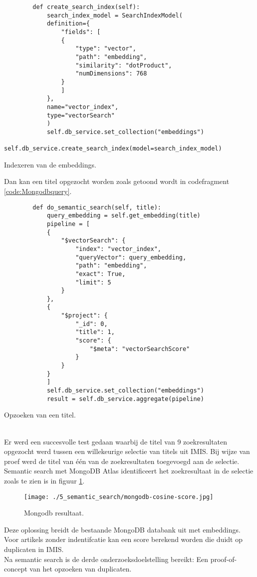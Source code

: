 \begin{listing}
    \begin{verbatim}
        def create_search_index(self):
            search_index_model = SearchIndexModel(
            definition={
                "fields": [
                {
                    "type": "vector",
                    "path": "embedding",
                    "similarity": "dotProduct",
                    "numDimensions": 768
                }
                ]
            },
            name="vector_index",
            type="vectorSearch"
            )
            self.db_service.set_collection("embeddings")
            self.db_service.create_search_index(model=search_index_model)
    \end{verbatim}
    \caption[MongoDB calculate index]{Indexeren van de embeddings.}
    \label{code:Mongodbindex}
\end{listing}
Dan kan een titel opgezocht worden zoals getoond wordt in codefragment \ref{code:Mongodbquery}.
\begin{listing}
    \begin{verbatim}
        def do_semantic_search(self, title):
            query_embedding = self.get_embedding(title)
            pipeline = [
            {
                "$vectorSearch": {
                    "index": "vector_index",
                    "queryVector": query_embedding,
                    "path": "embedding",
                    "exact": True,
                    "limit": 5
                }
            },
            {
                "$project": {
                    "_id": 0,
                    "title": 1,
                    "score": {
                        "$meta": "vectorSearchScore"
                    }
                }
            }
            ]
            self.db_service.set_collection("embeddings")
            result = self.db_service.aggregate(pipeline)
    \end{verbatim}
    \caption[MongoDB query]{Opzoeken van een titel.}
    \label{code:Mongodbquery}
\end{listing}
\\
Er werd een succesvolle test gedaan waarbij de titel van 9 zoekresultaten opgezocht werd tussen een willekeurige selectie van titels uit IMIS. Bij wijze van proef werd de titel van één van de zoekresultaten toegevoegd aan de selectie. Semantic search met MongoDB Atlas identificeert het zoekresultaat in de selectie zoals te zien is in figuur \ref{fig:Mongodb}.
\begin{figure}
    \centering
    \texttt{[image: ./5\_semantic\_search/mongodb-cosine-score.jpg]}
    \caption[Mongodb resultaat.]{\label{fig:Mongodb}Mongodb resultaat.}
\end{figure}
Deze oplossing breidt de bestaande MongoDB databank uit met embeddings. Voor artikels zonder indentifcatie kan een score berekend worden die duidt op duplicaten in IMIS.\\
Na semantic search is de derde onderzoeksdoelstelling bereikt: Een proof-of-concept van het opzoeken van duplicaten.
